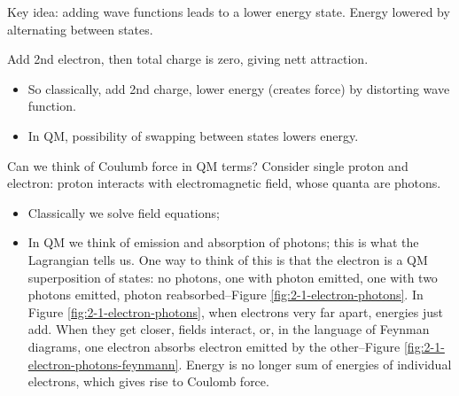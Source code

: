 \documentclass[]{article}
\begin{document}
Key idea: adding wave functions leads to a lower energy state. Energy lowered by alternating between states.

Add 2nd electron, then total charge is zero, giving nett attraction. 

\begin{itemize}
	\item So classically, add 2nd charge, lower energy (creates force) by distorting wave function.
	\item In QM, possibility of swapping between states lowers energy.
\end{itemize}
Can we think of Coulumb force in QM terms? Consider single proton and electron: proton interacts with electromagnetic field, whose quanta are photons.

\begin{itemize}
	\item Classically we solve field equations;
	\item In QM we think of emission and absorption of photons; this is what the Lagrangian tells us. One way to think of this is that the electron is a QM superposition of states: no photons, one with photon emitted,  one with two photons emitted, photon reabsorbed--Figure \ref{fig:2-1-electron-photons}. In Figure \ref{fig:2-1-electron-photons}, when electrons very far apart, energies just add. When they get closer, fields interact, or, in the language of Feynman diagrams, one electron absorbs electron emitted by the other--Figure \ref{fig:2-1-electron-photons-feynmann}.  Energy is no longer sum of energies of individual electrons, which gives rise to Coulomb force.
\end{itemize}
\end{document}

